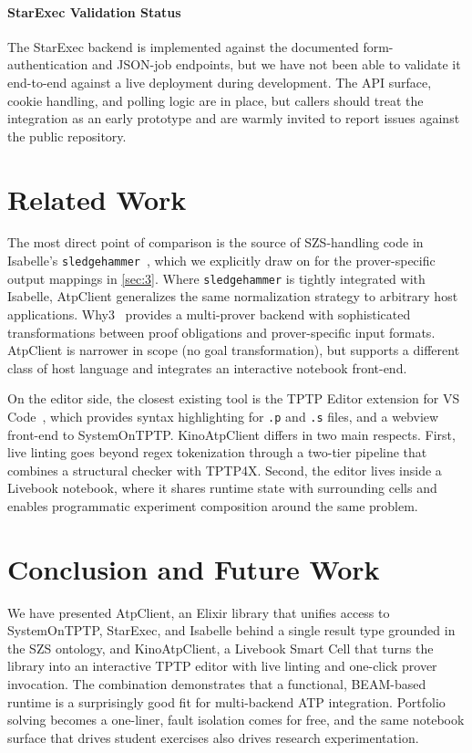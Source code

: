\documentclass[]{ceurart}
\begin{document}
\paragraph{StarExec Validation Status}

The StarExec backend is implemented against the documented form-authentication and JSON-job endpoints, but we have not been able to validate it end-to-end against a live deployment during development. The API surface, cookie handling, and polling logic are in place, but callers should treat the integration as an early prototype and are warmly invited to report issues against the public repository.

\section{Related Work}\label{sec:8}

The most direct point of comparison is the source of SZS-handling code in Isabelle's \texttt{sledgehammer}~\citep{blanchette2011sledgehammer}, which we explicitly draw on for the prover-specific output mappings in \cref{sec:3}. Where \texttt{sledgehammer} is tightly integrated with Isabelle, AtpClient generalizes the same normalization strategy to arbitrary host applications. Why3~\citep{filliatre2013why3} provides a multi-prover backend with sophisticated transformations between proof obligations and prover-specific input formats. AtpClient is narrower in scope (no goal transformation), but supports a different class of host language and integrates an interactive notebook front-end.

On the editor side, the closest existing tool is the TPTP Editor extension for VS Code~\citep{li2024tptpeditor}, which provides syntax highlighting for \texttt{.p} and \texttt{.s} files, and a webview front-end to SystemOnTPTP. KinoAtpClient differs in two main respects. First, live linting goes beyond regex tokenization through a two-tier pipeline that combines a structural checker with TPTP4X. Second, the editor lives inside a Livebook notebook, where it shares runtime state with surrounding cells and enables programmatic experiment composition around the same problem.

\section{Conclusion and Future Work}\label{sec:9}

We have presented AtpClient, an Elixir library that unifies access to SystemOnTPTP, StarExec, and Isabelle behind a single result type grounded in the SZS ontology, and KinoAtpClient, a Livebook Smart Cell that turns the library into an interactive TPTP editor with live linting and one-click prover invocation. The combination demonstrates that a functional, BEAM-based runtime is a surprisingly good fit for multi-backend ATP integration. Portfolio solving becomes a one-liner, fault isolation comes for free, and the same notebook surface that drives student exercises also drives research experimentation.
\end{document}
